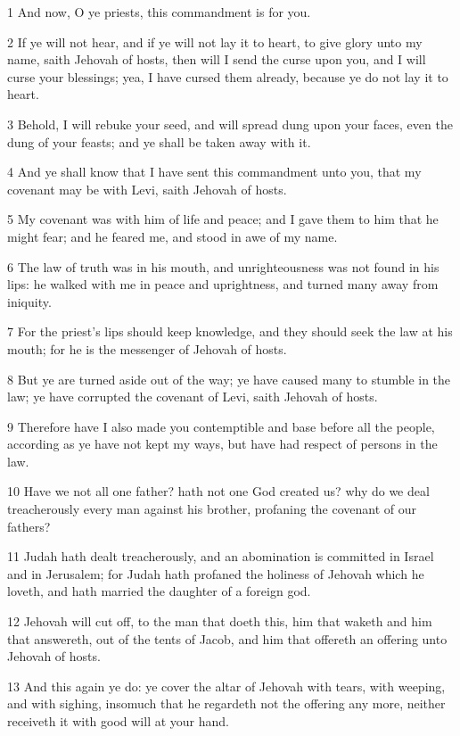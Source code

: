 \par 1 And now, O ye priests, this commandment is for you.
\par 2 If ye will not hear, and if ye will not lay it to heart, to give glory unto my name, saith Jehovah of hosts, then will I send the curse upon you, and I will curse your blessings; yea, I have cursed them already, because ye do not lay it to heart.
\par 3 Behold, I will rebuke your seed, and will spread dung upon your faces, even the dung of your feasts; and ye shall be taken away with it.
\par 4 And ye shall know that I have sent this commandment unto you, that my covenant may be with Levi, saith Jehovah of hosts.
\par 5 My covenant was with him of life and peace; and I gave them to him that he might fear; and he feared me, and stood in awe of my name.
\par 6 The law of truth was in his mouth, and unrighteousness was not found in his lips: he walked with me in peace and uprightness, and turned many away from iniquity.
\par 7 For the priest's lips should keep knowledge, and they should seek the law at his mouth; for he is the messenger of Jehovah of hosts.
\par 8 But ye are turned aside out of the way; ye have caused many to stumble in the law; ye have corrupted the covenant of Levi, saith Jehovah of hosts.
\par 9 Therefore have I also made you contemptible and base before all the people, according as ye have not kept my ways, but have had respect of persons in the law.
\par 10 Have we not all one father? hath not one God created us? why do we deal treacherously every man against his brother, profaning the covenant of our fathers?
\par 11 Judah hath dealt treacherously, and an abomination is committed in Israel and in Jerusalem; for Judah hath profaned the holiness of Jehovah which he loveth, and hath married the daughter of a foreign god.
\par 12 Jehovah will cut off, to the man that doeth this, him that waketh and him that answereth, out of the tents of Jacob, and him that offereth an offering unto Jehovah of hosts.
\par 13 And this again ye do: ye cover the altar of Jehovah with tears, with weeping, and with sighing, insomuch that he regardeth not the offering any more, neither receiveth it with good will at your hand.
